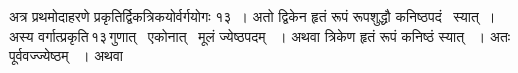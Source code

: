 \documentclass[11pt, openany]{book}
\begin{document}
\begin{sloppypar}
अत्र प्रथमोदाहरणे प्रकृतिर्द्विकत्रिकयोर्वर्गयोगः १३~। अतो द्विकेन हृतं रूपं रूपशुद्धौ कनिष्ठपदं \, स्यात्~। अस्य वर्गात्प्रकृति\textendash \,१३\textendash \,गुणात् \, एकोनात् \, मूलं ज्येष्ठपदम् ~। अथवा त्रिकेण हृतं रूपं कनिष्ठं स्यात् ~। अतः पूर्ववज्ज्येष्ठम् ~। अथवा 
\end{sloppypar}

\newpage
\end{document}

